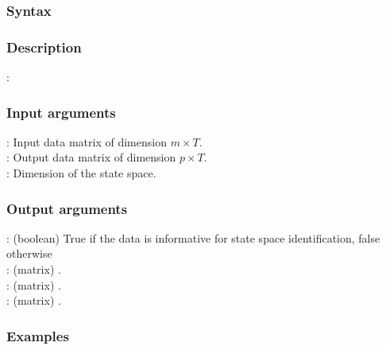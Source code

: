 \subsubsection*{Syntax}

\subsubsection*{Description}
: 

\subsubsection*{Input arguments}
\textbf{}: Input data matrix of dimension $m \times T$.\\
\textbf{}: Output data matrix of dimension $p \times T$.\\
\textbf{}: Dimension of the state space.

\subsubsection*{Output arguments}
\textbf{}: (boolean) True if the data is informative for state space identification, false otherwise\\
\textbf{}: (matrix) .\\
\textbf{}: (matrix) .\\
\textbf{}: (matrix) .

\subsubsection{Examples}